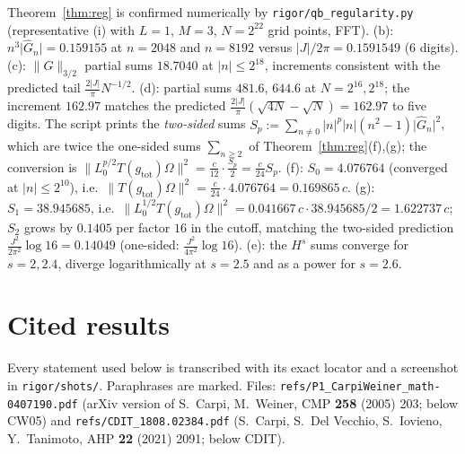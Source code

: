 \documentclass[11pt]{article}
\newcommand{\Om}{\Omega}
\newcommand{\norm}[1]{\lVert #1\rVert}
\newcommand{\abs}[1]{\lvert #1\rvert}
\newcommand{\gtot}{g_{\mathrm{tot}}}
\begin{document}
\begin{verdictok}
Theorem~\ref{thm:reg} is confirmed numerically by \texttt{rigor/qb\_regularity.py} (representative (i) with
$L=1$, $M=3$, $N=2^{22}$ grid points, FFT).  (b): $n^3\abs{\hat G_n}=0.159155$ at $n=2048$ and $n=8192$ versus
$\abs J/2\pi=0.1591549$ (6 digits).  (c): $\norm G_{3/2}$ partial sums $18.7040$ at $\abs n\le2^{18}$, increments
consistent with the predicted tail $\frac{2\abs J}\pi N^{-1/2}$.  (d): partial sums $481.6$, $644.6$ at
$N=2^{16},2^{18}$; the increment $162.97$ matches the predicted $\frac{2\abs J}\pi(\sqrt{4N}-\sqrt N)=162.97$
to five digits.  The script prints the \emph{two-sided} sums $S_p:=\sum_{n\ne0}\abs n^p\abs n(n^2-1)\abs{\hat G_n}^2
$, which are twice the one-sided sums $\sum_{n\ge2}$ of Theorem~\ref{thm:reg}(f),(g); the conversion is
$\norm{L_0^{p/2}T(\gtot)\Om}^2=\frac c{12}\cdot\frac{S_p}2=\frac c{24}S_p$.  (f): $S_0=4.076764$ (converged at
$\abs n\le2^{10}$), i.e.\ $\norm{T(\gtot)\Om}^2=\frac c{24}\cdot4.076764=0.169865\,c$.  (g): $S_1=38.945685$,
i.e.\ $\norm{L_0^{1/2}T(\gtot)\Om}^2=0.041667\,c\cdot38.945685/2=1.622737\,c$; $S_2$ grows by $0.1405$ per factor
$16$ in the cutoff, matching the two-sided prediction $\frac{J^2}{2\pi^2}\log16=0.14049$ (one-sided:
$\frac{J^2}{4\pi^2}\log16$).
(e): the $H^s$ sums converge for $s=2,2.4$, diverge logarithmically at $s=2.5$ and as a power for $s=2.6$.
\end{verdictok}

\section{Cited results}\label{sec:cited}

Every statement used below is transcribed with its exact locator and a screenshot in \texttt{rigor/shots/}.
Paraphrases are marked.  Files: \texttt{refs/P1\_CarpiWeiner\_math-0407190.pdf} (arXiv version of
S.~Carpi, M.~Weiner, CMP \textbf{258} (2005) 203; below CW05) and \texttt{refs/CDIT\_1808.02384.pdf}
(S.~Carpi, S.~Del Vecchio, S.~Iovieno, Y.~Tanimoto, AHP \textbf{22} (2021) 2091; below CDIT).
\end{document}
